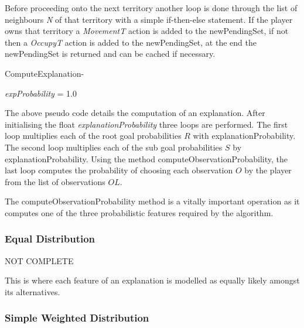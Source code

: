 \documentclass[parskip]{cs4rep}
\begin{document}
Before proceeding onto the next territory another loop is done through the list of neighbours \textit{N} of that territory with a simple if-then-else statement. If the player owns that territory a \textit{MovementT} action is added to the newPendingSet, if not then a \textit{OccupyT} action is added to the newPendingSet, at the end the newPendingSet is returned and can be cached if necessary.

\begin{pseudocode}{ComputeExplanation}{-}
\begin{algorithm}[H]

\textit{expProbability} = 1.0




\end{algorithm}
\end{pseudocode}

The above pseudo code details the computation of an explanation. After initialising the float \textit{explanationProbability} three loops are performed. The first loop multiplies each of the root goal probabilities $R$ with explanationProbability. The second loop multiplies each of the sub goal probabilities $S$ by explanationProbability. Using the method computeObservationProbability, the last loop computes the probability of choosing each observation $O$ by the player from the list of observations $OL$.

The computeObservationProbability method is a vitally important operation as it computes one of the three probabilistic features required by the algorithm.

\subsubsection{Equal Distribution}

NOT COMPLETE

This is where each feature of an explanation is modelled as equally likely amongst its alternatives. 

\subsubsection{Simple Weighted Distribution}
\end{document}
